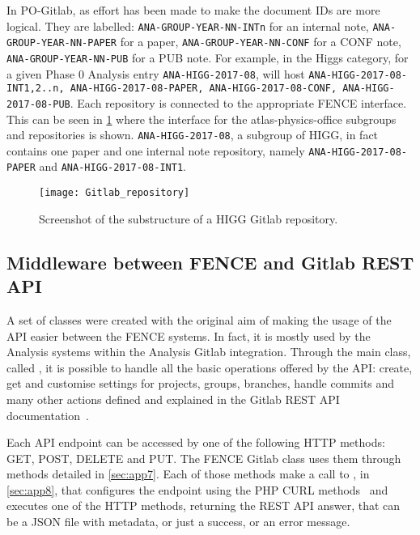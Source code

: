 In PO-Gitlab, as effort has been made to make the document IDs are more logical.
They are labelled: \texttt{ANA-GROUP-YEAR-NN-INTn} for an internal note,
\texttt{ANA-GROUP-YEAR-NN-PAPER} for a paper,
\texttt{ANA-GROUP-YEAR-NN-CONF} for a CONF note,
\texttt{ANA-GROUP-YEAR-NN-PUB} for a PUB note.
For example, in the Higgs category, for a given Phase 0 Analysis entry \texttt{ANA-HIGG-2017-08},
\pogitlab will host \texttt{ANA-HIGG-2017-08-INT1,2..n, ANA-HIGG-2017-08-PAPER, ANA-HIGG-2017-08-CONF, ANA-HIGG-2017-08-PUB}.
Each repository is connected to the appropriate FENCE interface.
This can be seen in \cref{fig:Gitlab_repository} where the \gitlab interface for the atlas-physics-office subgroups and repositories is shown.
\texttt{ANA-HIGG-2017-08}, a subgroup of HIGG, in fact contains one paper and one internal note repository, namely \texttt{ANA-HIGG-2017-08-PAPER} and \texttt{ANA-HIGG-2017-08-INT1}.

\begin{figure}[htb]
  \centering
  \texttt{[image: Gitlab\_repository]}
  \caption{Screenshot of the substructure of a HIGG Gitlab repository.}%
  \label{fig:Gitlab_repository}
\end{figure}

\subsection{Middleware between FENCE and Gitlab REST API}%
\label{sec:Middleware_between_FENCE_and_Gitlab_REST_API}

A set of classes were created with the original aim of making the usage of the \gitlab API easier between the FENCE systems.
In fact, it is mostly used by the Analysis systems within the Analysis Gitlab integration.
Through the main class, called , it is possible to handle all the basic operations offered by the API\@: create, get and customise settings for projects, groups, branches, handle commits and many other actions defined and explained in the Gitlab REST API documentation~\cite{rest_api}.

Each API endpoint can be accessed by one of the following HTTP methods: GET, POST, DELETE and PUT\@.
The FENCE Gitlab class uses them through methods detailed in \cref{sec:app7}.
Each of those methods make a call to , in \cref{sec:app8}, that configures the endpoint using the PHP CURL methods~\cite{php_curl} and executes one of the HTTP methods, returning the REST API answer, that can be a JSON file with metadata, or just a success, or an error message.

